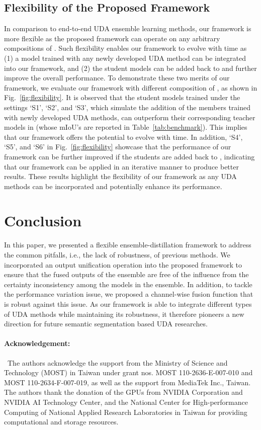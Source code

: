 \documentclass[final]{cvpr}
\begin{document}
 \subsection{Flexibility of the Proposed Framework}
\label{sec:experiments:flexibility}
In comparison to end-to-end UDA ensemble learning methods, our framework is more flexible as the proposed framework can operate on any arbitrary compositions of . Such flexibility enables our framework to evolve with time as (1) a model trained with any newly developed UDA method can be integrated into our framework, and (2) the student models can be added back to  and further improve the overall performance. To demonstrate these two merits of our framework, we evaluate our framework with different composition of , as shown in Fig.~\ref{fig:flexibility}. It is observed that the student models trained under the settings `S1', `S2', and `S3', which simulate the addition of the members trained with newly developed UDA methods, can outperform their corresponding teacher models in  (whose mIoU's are reported in Table~\ref{tab:benchmark}). This implies that our framework offers the potential to evolve with time. In addition, `S4', `S5', and `S6' in Fig.~\ref{fig:flexibility} showcase that the performance of our framework can be further improved if the students are added back to , indicating that our framework can be applied in an iterative manner to produce better results. These results highlight the flexibility of our framework as any UDA methods can be incorporated and potentially enhance its performance.  \section{Conclusion}
\label{sec:conclusion}
In this paper, we presented a flexible ensemble-distillation framework to address the common pitfalls, i.e., the lack of robustness, of previous methods. We incorporated an output unification operation into the proposed framework to ensure that the fused outputs of the ensemble are free of the influence from the certainty inconsistency among the models in the ensemble. In addition, to tackle the performance variation issue, we proposed a channel-wise fusion function that is robust against this issue. As our framework is able to integrate different types of UDA methods while maintaining its robustness, it therefore pioneers a new direction for future semantic segmentation based UDA researches.

\paragraph{Acknowledgement: }~The authors acknowledge the support from the Ministry of Science and Technology (MOST) in Taiwan under grant nos. MOST 110-2636-E-007-010 and MOST 110-2634-F-007-019, as well as the support from MediaTek Inc., Taiwan. The authors thank the donation of the GPUs from NVIDIA Corporation and NVIDIA AI Technology Center, and the National Center for High-performance Computing of National Applied Research Laboratories in Taiwan for providing computational and storage resources.   \clearpage

{\small


}

\clearpage


\end{document}
